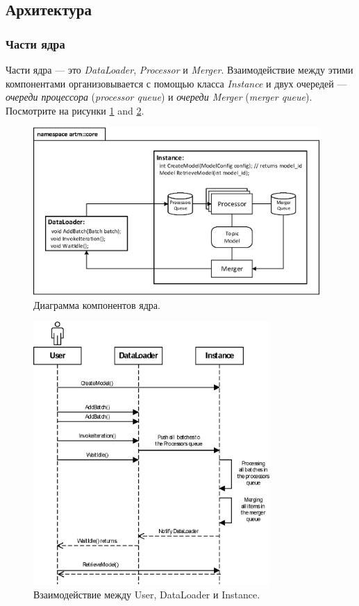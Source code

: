 \documentclass[12pt]{article}
\begin{document}
\subsection{Архитектура}
\subsubsection{Части ядра}
Части ядра --- это {\it DataLoader}, {\it Processor} и {\it Merger}. Взаимодействие между этими компонентами организовывается с помощью класса {\it Instance} и двух очередей --- {\it очереди процессора} ({\it processor queue}) и {\it очереди Merger} ({\it merger queue}). Посмотрите на рисунки  \ref{fig:diagramm_artm_core} and \ref{fig:diagramm_workflow}.

\begin{figure}[h!]
\begin{centering}
\includegraphics[height=64mm]{diagramm_artm_core.eps}
\caption{Диаграмма компонентов ядра.}
\label{fig:diagramm_artm_core}
\end{centering}
\end{figure}
\vspace{1ex}

\begin{figure}[h!]
\begin{centering}
\includegraphics[width=90mm]{diagramm_workflow.eps}
\caption{Взаимодействие между User, DataLoader и Instance.}
\label{fig:diagramm_workflow}
\end{centering}
\end{figure}
\end{document}

